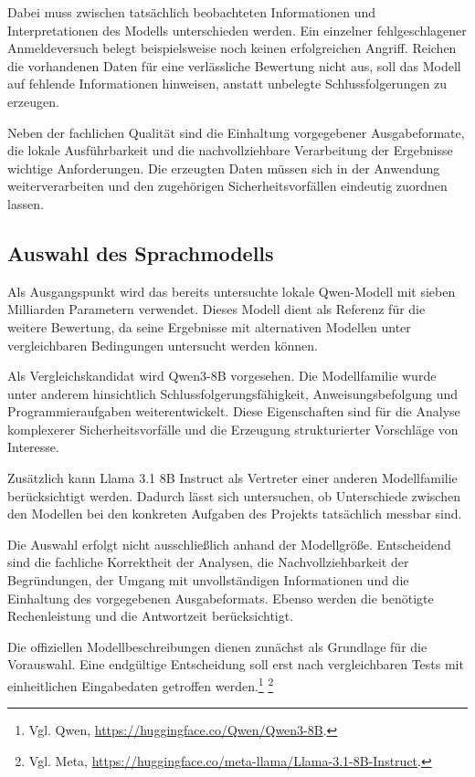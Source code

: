 Dabei muss zwischen tatsächlich beobachteten Informationen und
Interpretationen des Modells unterschieden werden. Ein einzelner
fehlgeschlagener Anmeldeversuch belegt beispielsweise noch keinen
erfolgreichen Angriff. Reichen die vorhandenen Daten für eine
verlässliche Bewertung nicht aus, soll das Modell auf fehlende
Informationen hinweisen, anstatt unbelegte Schlussfolgerungen zu
erzeugen.

Neben der fachlichen Qualität sind die Einhaltung vorgegebener
Ausgabeformate, die lokale Ausführbarkeit und die nachvollziehbare
Verarbeitung der Ergebnisse wichtige Anforderungen. Die erzeugten
Daten müssen sich in der Anwendung weiterverarbeiten und den
zugehörigen Sicherheitsvorfällen eindeutig zuordnen lassen.

\subsection{Auswahl des Sprachmodells}

Als Ausgangspunkt wird das bereits untersuchte lokale Qwen-Modell
mit sieben Milliarden Parametern verwendet. Dieses Modell dient als
Referenz für die weitere Bewertung, da seine Ergebnisse mit
alternativen Modellen unter vergleichbaren Bedingungen untersucht
werden können.

Als Vergleichskandidat wird Qwen3-8B vorgesehen. Die Modellfamilie
wurde unter anderem hinsichtlich Schlussfolgerungsfähigkeit,
Anweisungsbefolgung und Programmieraufgaben weiterentwickelt.
Diese Eigenschaften sind für die Analyse komplexerer
Sicherheitsvorfälle und die Erzeugung strukturierter Vorschläge
von Interesse.

Zusätzlich kann Llama 3.1 8B Instruct als Vertreter einer anderen
Modellfamilie berücksichtigt werden. Dadurch lässt sich untersuchen,
ob Unterschiede zwischen den Modellen bei den konkreten Aufgaben
des Projekts tatsächlich messbar sind.

Die Auswahl erfolgt nicht ausschließlich anhand der Modellgröße.
Entscheidend sind die fachliche Korrektheit der Analysen, die
Nachvollziehbarkeit der Begründungen, der Umgang mit unvollständigen
Informationen und die Einhaltung des vorgegebenen Ausgabeformats.
Ebenso werden die benötigte Rechenleistung und die Antwortzeit
berücksichtigt.

Die offiziellen Modellbeschreibungen dienen zunächst als Grundlage
für die Vorauswahl. Eine endgültige Entscheidung soll erst nach
vergleichbaren Tests mit einheitlichen Eingabedaten getroffen
werden.\footnote{Vgl. Qwen, \url{https://huggingface.co/Qwen/Qwen3-8B}.}
\footnote{Vgl. Meta, \url{https://huggingface.co/meta-llama/Llama-3.1-8B-Instruct}.}

